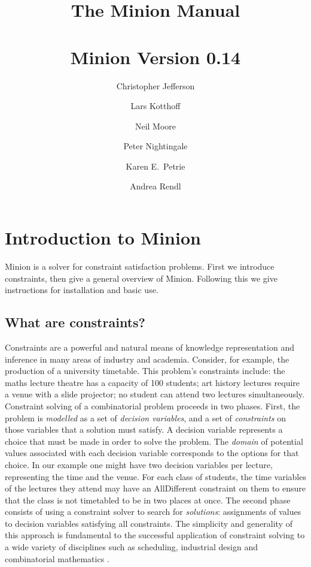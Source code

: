 \documentclass[oneside]{book}
\def\minionversion{0.14}
\begin{document}
\title{{\bf The Minion Manual}\\
~\\
Minion Version \minionversion}
\author{Christopher Jefferson \and Lars Kotthof\/f \and Neil Moore \and Peter Nightingale \and Karen E.\ Petrie \and Andrea Rendl}

\maketitle
\tableofcontents

\chapter{Introduction to Minion}

Minion is a solver for constraint satisfaction problems. First we
introduce constraints, then give a general overview of Minion. Following
this we give instructions for installation and basic use.


\section{What are constraints?}

Constraints are a powerful and natural means of knowledge representation
and inference in many areas of industry and academia. Consider, for
example, the production of a university timetable. This problem's
constraints include: the maths lecture theatre has a capacity of 100
students; art history lectures require a venue with a slide projector;
no student can attend two lectures simultaneously. Constraint solving
of a combinatorial problem proceeds in two phases. First, the problem
is \emph{modelled} as a set of \emph{decision variables}, and a set
of \emph{constraints} on those variables that a solution must satisfy.
A decision variable represents a choice that must be made in order
to solve the problem. The \emph{domain} of potential values associated
with each decision variable corresponds to the options for that choice.
In our example one might have two decision variables per lecture,
representing the time and the venue. For each class of students, the
time variables of the lectures they attend may have an AllDifferent
constraint on them to ensure that the class is not timetabled to be
in two places at once. The second phase consists of using a constraint
solver to search for \emph{solutions}: assignments of values to decision
variables satisfying all constraints. The simplicity and generality
of this approach is fundamental to the successful application of constraint
solving to a wide variety of disciplines such as scheduling, industrial
design and combinatorial mathematics \cite{wallace:Survey}.
\end{document}
